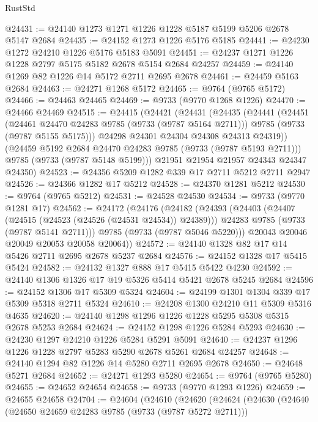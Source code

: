 \begin{lexlean}{RustStd}
\begin{coremodule}
{\begin{coremodule}
{{{{{{{{{{{{{{{{{{{{{{{{{{{{{{{{{{{{{{{{{{{{{{{{{{{{{{{@24431 := @24140 @1273 @1271 @1226 @1228 @5187 @5199 @5206 @2678 @5147 @2684
@24435 := @24152 @1273 @1226 @5176 @5185
@24441 := @24230 @1272 @24210 @1226 @5176 @5183 @5091
@24451 := @24237 @1271 @1226 @1228 @2797 @5175 @5182 @2678 @5154 @2684 @24257
@24459 := @24140 @1269 @82 @1226 @14 @5172 @2711 @2695 @2678
@24461 := @24459 @5163 @2684
@24463 := @24271 @1268 @5172
@24465 := @9764 (@9765 @5172)
@24466 := @24463 @24465
@24469 := @9733 (@9770 @1268 @1226)
@24470 := @24466 @24469
@24515 := @24415
    (@24421
      (@24431
        (@24435
          (@24441
            (@24451
              (@24461 @24470 @24283 @9785 (@9733 (@9787 @5164 @2711)))
              @9785
              (@9733 (@9787 @5155 @5175)))
            @24298
            @24301
            @24304
            @24308
            @24313
            @24319))
        (@24459 @5192 @2684 @24470 @24283 @9785 (@9733 (@9787 @5193 @2711)))
        @9785
        (@9733 (@9787 @5148 @5199)))
      @21951
      @21954
      @21957
      @24343
      @24347
      @24350)
@24523 := @24356 @5209 @1282 @339 @17 @2711 @5212 @2711 @2947
@24526 := @24366 @1282 @17 @5212
@24528 := @24370 @1281 @5212
@24530 := @9764 (@9765 @5212)
@24531 := @24528 @24530
@24534 := @9733 (@9770 @1281 @17)
@24562 := @24172
    (@24176
      (@24182
        (@24393
          (@24403
            (@24407 (@24515 (@24523 (@24526 (@24531 @24534)) @24389)))
            @24283
            @9785
            (@9733 (@9787 @5141 @2711)))
          @9785
          (@9733 (@9787 @5046 @5220)))
        @20043
        @20046
        @20049
        @20053
        @20058
        @20064))
@24572 := @24140 @1328 @82 @17 @14 @5426 @2711 @2695 @2678 @5237 @2684
@24576 := @24152 @1328 @17 @5415 @5424
@24582 := @24132 @1327 @888 @17 @5415 @5422 @4230
@24592 := @24140 @1306 @1326 @17 @19 @5326 @5414 @5421 @2678 @5245 @2684
@24596 := @24152 @1306 @17 @5309 @5324
@24604 := @24199 @1301 @1304 @339 @17 @5309 @5318 @2711 @5324
@24610 := @24208 @1300 @24210 @11 @5309 @5316 @4635
@24620 := @24140 @1298 @1296 @1226 @1228 @5295 @5308 @5315 @2678 @5253 @2684
@24624 := @24152 @1298 @1226 @5284 @5293
@24630 := @24230 @1297 @24210 @1226 @5284 @5291 @5091
@24640 := @24237 @1296 @1226 @1228 @2797 @5283 @5290 @2678 @5261 @2684 @24257
@24648 := @24140 @1294 @82 @1226 @14 @5280 @2711 @2695 @2678
@24650 := @24648 @5271 @2684
@24652 := @24271 @1293 @5280
@24654 := @9764 (@9765 @5280)
@24655 := @24652 @24654
@24658 := @9733 (@9770 @1293 @1226)
@24659 := @24655 @24658
@24704 := @24604
    (@24610
      (@24620
        (@24624
          (@24630
            (@24640
              (@24650 @24659 @24283 @9785 (@9733 (@9787 @5272 @2711)))
}}}}}}}}}}}}}}}}}}}}}}}}}}}}}}}}}}}}}}}}}}}}}}}}}}}}}}}
\end{coremodule}}
\end{coremodule}
\end{lexlean}
